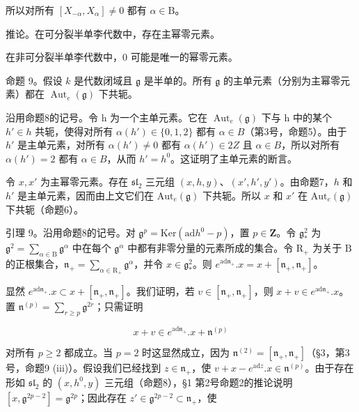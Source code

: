 所以对所有 \([X_{-\alpha}, X_{\alpha}] \neq 0\) 都有 \(\alpha \in \mathrm{B}\)。

推论。在可分裂半单李代数中，存在主幂零元素。

在非可分裂半单李代数中，0 可能是唯一的幂零元素。

命题 9。假设 \(k\) 是代数闭域且 \(\mathfrak{g}\) 是半单的。所有 \(\mathfrak{g}\) 的主单元素（分别为主幂零元素）都在 \(\operatorname{Aut}_e(\mathfrak{g})\) 下共轭。

沿用命题8的记号。令 h 为一个主单元素。它在 \(\operatorname{Aut}_{e}(\mathfrak{g})\) 下与 h 中的某个 \(h' \in h\) 共轭，使得对所有 \(\alpha(h') \in \{0,1,2\}\) 都有 \(\alpha \in B\)（第3号，命题5）。由于 \(h'\) 是主单元素，对所有 \(\alpha(h') \neq 0\) 都有 \(\alpha(h') \in 2Z\) 且 \(\alpha \in B\)，所以对所有 \(\alpha(h') = 2\) 都有 \(\alpha \in B\)，从而 \(h' = h^{0}\)。这证明了主单元素的断言。

令 \(x, x'\) 为主幂零元素。存在 \(\mathfrak{sl}_2\) 三元组 \((x, h, y)\)、\((x', h', y')\)。由命题7，\(h\) 和 \(h'\) 是主单元素，因而由上文它们在 \(\mathrm{Aut}_e(\mathfrak{g})\) 下共轭。所以 \(x\) 和 \(x'\) 在 \(\mathrm{Aut}_e(\mathfrak{g})\) 下共轭（命题6）。

引理 9。沿用命题8的记号。对 \(\mathfrak{g}^p = \mathrm{Ker}(\mathrm{ad}h^0 - p)\)，置 \(p \in \mathbf{Z}\)。令 \(\mathfrak{g}_*^2\) 为 \(\mathfrak{g}^2 = \sum_{\alpha \in \mathrm{B}} \mathfrak{g}^\alpha\) 中在每个 \(\mathfrak{g}^\alpha\) 中都有非零分量的元素所成的集合。令 \(\mathrm{R}_+\) 为关于 \(\mathrm{B}\) 的正根集合，\(\mathfrak{n}_+ = \sum_{\alpha \in \mathrm{R}_+} \mathfrak{g}^\alpha\)，并令 \(x \in \mathfrak{g}_*^2\)。则 \(e^{\mathrm{ad}\mathfrak{n}_+}. x = x + [\mathfrak{n}_+, \mathfrak{n}_+]\)。

显然 \(e^{\mathrm{ad} \mathfrak{n}_+}.x \subset x + [\mathfrak{n}_+, \mathfrak{n}_+]\)。我们证明，若 \(v \in [\mathfrak{n}_+, \mathfrak{n}_+]\)，则 \(x + v \in e^{\mathrm{ad} \mathfrak{n}_+}.x\)。置 \(\mathfrak{n}^{(p)} = \sum_{r \geq p} \mathfrak{g}^{2r}\)；只需证明

\[
x + v \in e ^ {\mathrm{ad} \mathfrak {n} _ {+}}. x + \mathfrak {n} ^ {(p)}
\]

对所有 \(p \geq 2\) 都成立。当 \(p = 2\) 时这显然成立，因为 \(\mathfrak{n}^{(2)} = [\mathfrak{n}_+, \mathfrak{n}_+]\)（§3，第3号，命题9 (iii)）。假设我们已经找到 \(z \in \mathfrak{n}_+\)，使 \(v + x - e^{\mathrm{ad}z}.x \in \mathfrak{n}^{(p)}\)。由于存在形如 \(\mathfrak{sl}_2\) 的 \((x, h^0, y)\) 三元组（命题8），§1 第2号命题2的推论说明 \([x, \mathfrak{g}^{2p-2}] = \mathfrak{g}^{2p}\)；因此存在 \(z' \in \mathfrak{g}^{2p-2} \subset \mathfrak{n}_+\)，使

